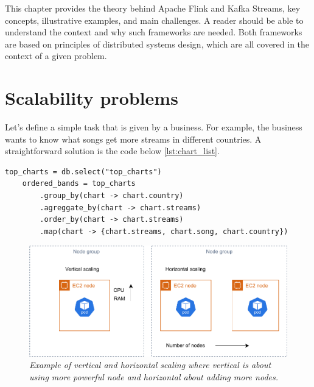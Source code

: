 This chapter provides the theory behind Apache Flink and Kafka Streams, key concepts,
illustrative examples, and main challenges.
A reader should be able to understand the context and why such frameworks are needed.
Both frameworks are based on principles of distributed systems design,
which are all covered in the context of a given problem.


\section{Scalability problems}\label{subsec:simple-pip}
Let's define a simple task that is given by a business.
For example, the business wants to know what songs get more streams in different countries.
A straightforward solution is the code below \ref{lst:chart_list}.

\small
\begin{lstlisting}[label={lst:chart_list}]
    top_charts = db.select("top_charts")
    ordered_bands = top_charts
        .group_by(chart -> chart.country)
        .agreggate_by(chart -> chart.streams)
        .order_by(chart -> chart.streams)
        .map(chart -> {chart.streams, chart.song, chart.country})
\end{lstlisting}
\normalsize

\begin{figure}[H]
    \centering
    \includegraphics[width=1\textwidth]{figures/vertical-horizontal-scaling}
    \caption{\textit{Example of vertical and horizontal scaling where vertical is about using more powerful node
    and horizontal about adding more nodes.}}
    \label{fig:vert-hor-scal}
\end{figure}


